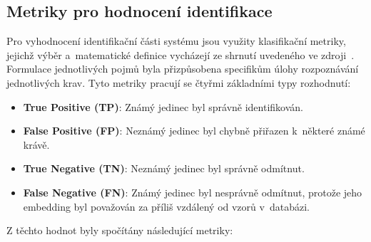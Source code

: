 \subsection*{Metriky pro hodnocení identifikace}
Pro vyhodnocení identifikační části systému jsou využity klasifikační metriky, jejichž výběr a~matematické definice vycházejí ze shrnutí uvedeného ve zdroji~\cite{lossMetrics}. Formulace jednotlivých pojmů byla přizpůsobena specifikům úlohy rozpoznávání jednotlivých krav. Tyto metriky pracují se čtyřmi základními typy rozhodnutí:

\begin{itemize}
	\item \textbf{True Positive (TP)}: Známý jedinec byl správně identifikován.
	\item \textbf{False Positive (FP)}: Neznámý jedinec byl chybně přiřazen k~některé známé krávě.
	\item \textbf{True Negative (TN)}: Neznámý jedinec byl správně odmítnut.
	\item \textbf{False Negative (FN)}: Známý jedinec byl nesprávně odmítnut, protože jeho embedding byl považován za příliš vzdálený od vzorů v~databázi.
\end{itemize}
Z těchto hodnot byly spočítány následující metriky:
